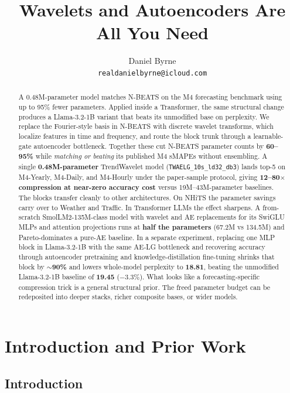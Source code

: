 \documentclass[11pt,a4paper]{article}
\title{Wavelets and Autoencoders Are All You Need}
\author{%
  Daniel Byrne \\
  \texttt{realdanielbyrne@icloud.com} \\
}
\begin{document}
\maketitle

\begin{abstract}
A 0.48M-parameter model matches N-BEATS on the M4 forecasting benchmark using up to 95\% fewer parameters. Applied inside a Transformer, the same structural change produces a Llama-3.2-1B variant that beats its unmodified base on perplexity. We replace the Fourier-style basis in N-BEATS \citep{oreshkin2020nbeats} with discrete wavelet transforms, which localize features in time and frequency, and route the block trunk through a learnable-gate autoencoder bottleneck. Together these cut N-BEATS parameter counts by \textbf{60--95\%} while \emph{matching or beating} its published M4 sMAPEs without ensembling. A single \textbf{0.48M-parameter} TrendWavelet model (\texttt{TWAELG\_10s\_ld32\_db3}) lands top-5 on M4-Yearly, M4-Daily, and M4-Hourly under the paper-sample protocol, giving \textbf{12--80$\times$ compression at near-zero accuracy cost} versus 19M--43M-parameter baselines. The blocks transfer cleanly to other architectures. On NHiTS the parameter savings carry over to Weather and Traffic. In Transformer LLMs the effect sharpens. A from-scratch SmolLM2-135M-class model with wavelet and AE replacements for its SwiGLU MLPs and attention projections runs at \textbf{half the parameters} (67.2M vs 134.5M) and Pareto-dominates a pure-AE baseline. In a separate experiment, replacing one MLP block in Llama-3.2-1B with the same AE-LG bottleneck and recovering accuracy through autoencoder pretraining and knowledge-distillation fine-tuning shrinks that block by \textbf{$\sim$90\%} and lowers whole-model perplexity to \textbf{18.81}, beating the unmodified Llama-3.2-1B baseline of \textbf{19.45} ($-3.3\%$). What looks like a forecasting-specific compression trick is a general structural prior. The freed parameter budget can be redeposited into deeper stacks, richer composite bases, or wider models.
\end{abstract}


\section{Introduction and Prior Work}
\label{sec:intro}

\subsection{Introduction}
\end{document}
